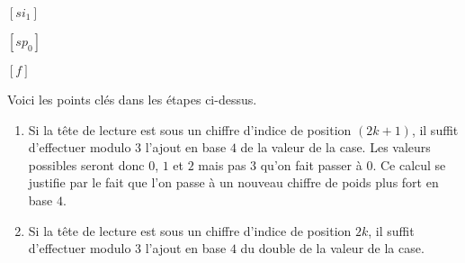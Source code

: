 \begin{multicols}{2}
\medskip

\emptybox\emptybox%
\emptybox\emptybox

\phantom{\emptybox\emptybox}%
	\head{}$[si_1]$

% 

\medskip

\emptybox\emptybox%
\emptybox\emptybox

\phantom{\emptybox}%
	\head{}$[sp_0]$

% 

\medskip

\emptybox\emptybox%
\emptybox\emptybox

\phantom{\emptybox}%
	\head{} $[f]$

\vfill\null
\end{multicols}


\vspace{-1em}

Voici les points clés dans les étapes ci-dessus.
\begin{enumerate}
	\item Si la tête de lecture est sous un chiffre d'indice de position $(2k+1)$, il suffit d'effectuer modulo $3$ l'ajout en base $4$ de la valeur de la case. Les valeurs possibles seront donc $0$, $1$ et $2$ mais pas $3$ qu'on fait passer à $0$.
	      Ce calcul se justifie par le fait que l'on passe à un nouveau chiffre de poids plus fort en base $4$.


	\item Si la tête de lecture est sous un chiffre d'indice de position $2k$, il suffit d'effectuer modulo $3$ l'ajout en base $4$ du double de la valeur de la case.
\end{enumerate}



